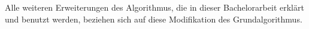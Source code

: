 Alle weiteren Erweiterungen des Algorithmus, die in dieser Bachelorarbeit erklärt und benutzt werden, beziehen sich auf diese Modifikation des Grundalgorithmus.

%
%	
%	


